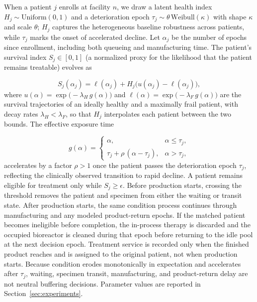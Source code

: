 \documentclass[preprint,review,12pt]{elsarticle}
\begin{document}
When a patient $j$ enrolls at facility $n$, we draw a latent health index $H_j \sim \mathrm{Uniform}(0,1)$ and a deterioration epoch $\tau_j \sim \theta\,\mathrm{Weibull}(\kappa)$ with shape $\kappa$ and scale $\theta$; $H_j$ captures the heterogeneous baseline robustness across patients, while $\tau_j$ marks the onset of accelerated decline. Let $\alpha_j$ be the number of epochs since enrollment, including both queueing and manufacturing time. The patient's survival index $S_j \in [0,1]$ (a normalized proxy for the likelihood that the patient remains treatable) evolves as

\begin{equation}
\label{eq:survival}
S_j(\alpha_j) = \ell(\alpha_j) + H_j\big(u(\alpha_j) - \ell(\alpha_j)\big),
\end{equation}
where $u(\alpha)=\exp\!\big(-\lambda_H\,g(\alpha)\big)$ and $\ell(\alpha)=\exp\!\big(-\lambda_F\,g(\alpha)\big)$ are the survival trajectories of an ideally healthy and a maximally frail patient, with decay rates $\lambda_H < \lambda_F$, so that $H_j$ interpolates each patient between the two bounds. The effective exposure time

\begin{equation}
\label{eq:effective-time}
g(\alpha) =
\begin{cases}
\alpha, & \alpha \le \tau_j,\\[2pt]
\tau_j + \rho\,(\alpha - \tau_j), & \alpha > \tau_j,
\end{cases}
\end{equation}
accelerates by a factor $\rho > 1$ once the patient passes the deterioration epoch $\tau_j$, reflecting the clinically observed transition to rapid decline. A patient remains eligible for treatment only while $S_j \ge \epsilon$. Before production starts, crossing the threshold removes the patient and specimen from either the waiting or transit state. After production starts, the same condition process continues through manufacturing and any modeled product-return epochs. If the matched patient becomes ineligible before completion, the in-process therapy is discarded and the occupied bioreactor is cleaned during that epoch before returning to the idle pool at the next decision epoch. Treatment service is recorded only when the finished product reaches and is assigned to the original patient, not when production starts. Because condition erodes monotonically in expectation and accelerates after $\tau_j$, waiting, specimen transit, manufacturing, and product-return delay are not neutral buffering decisions. Parameter values are reported in Section~\ref{sec:experiments}.
\end{document}
